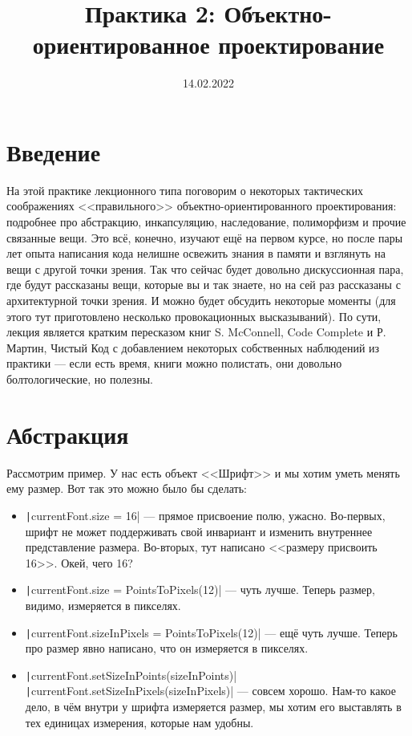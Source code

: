 \documentclass[a5paper]{article}
\title{Практика 2: Объектно-ориентированное проектирование}
\date{14.02.2022}
\begin{document}
\maketitle
\thispagestyle{empty}

\section{Введение}

На этой практике лекционного типа поговорим о некоторых тактических соображениях <<правильного>> объектно-ориентированного проектирования: подробнее про абстракцию, инкапсуляцию, наследование, полиморфизм и прочие связанные вещи. Это всё, конечно, изучают ещё на первом курсе, но после пары лет опыта написания кода нелишне освежить знания в памяти и взглянуть на вещи с другой точки зрения. Так что сейчас будет довольно дискуссионная пара, где будут рассказаны вещи, которые вы и так знаете, но на сей раз рассказаны с архитектурной точки зрения. И можно будет обсудить некоторые моменты (для этого тут приготовлено несколько провокационных высказываний). По сути, лекция является кратким пересказом книг S. McConnell, Code Complete и Р. Мартин, Чистый Код с добавлением некоторых собственных наблюдений из практики --- если есть время, книги можно полистать, они довольно болтологические, но полезны.

\section{Абстракция}

Рассмотрим пример. У нас есть объект <<Шрифт>> и мы хотим уметь менять ему размер. Вот так это можно было бы сделать:

\begin{itemize}
    \item \texttt|currentFont.size = 16| --- прямое присвоение полю, ужасно. Во-первых, шрифт не может поддерживать свой инвариант и изменить внутреннее представление размера. Во-вторых, тут написано <<размеру присвоить 16>>. Окей, чего 16?
    \item \texttt|currentFont.size = PointsToPixels(12)| --- чуть лучше. Теперь размер, видимо, измеряется в пикселях.
    \item \texttt|currentFont.sizeInPixels = PointsToPixels(12)| --- ещё чуть лучше. Теперь про размер явно написано, что он измеряется в пикселях.
    \item \texttt|currentFont.setSizeInPoints(sizeInPoints)| \newline
            \texttt|currentFont.setSizeInPixels(sizeInPixels)| --- совсем хорошо. Нам-то какое дело, в чём внутри у шрифта измеряется размер, мы хотим его выставлять в тех единицах измерения, которые нам удобны.
\end{itemize}
\end{document}
